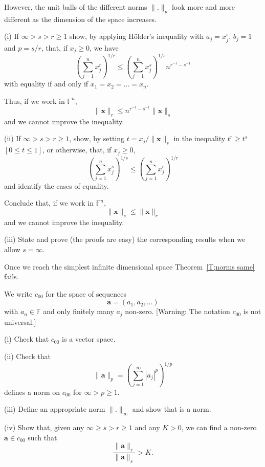 However, the unit balls of the different norms $\|.\|_{p}$
look more and more different as the dimension of the space increases.
\begin{exercise}\label{E;increase norm} (i) If $\infty>s>r\geq 1$ 
show, by applying H\"{o}lder's inequality with
$a_{j}=x_{j}^{s}$, $b_{j}=1$ and $p=s/r$, that,
if $x_{j}\geq 0$, we have
\[\left(\sum_{j=1}^{n}x_{j}^{r}\right)^{1/r}\leq
\left(\sum_{j=1}^{n}x_{j}^{s}\right)^{1/s}n^{r^{-1}-s^{-1}}\]
with equality if and only if $x_{1}=x_{2}=\dots=x_{n}$.

Thus, if we work in ${\mathbb F}^{n}$,
\[\|{\mathbf x}\|_{r}\leq n^{r^{-1}-s^{-1}}\|{\mathbf x}\|_{s}\]
and we cannot improve the inequality.

(ii) If $\infty>s>r\geq 1$, show, by setting $t=x_{j}/\|{\mathbf x}\|_{s}$
in the inequality $t^{r}\geq t^{s}$ $[0\leq t\leq 1]$,
or otherwise, that, if $x_{j}\geq 0$,
\[\left(\sum_{j=1}^{n}x_{j}^{s}\right)^{1/s}\leq
\left(\sum_{j=1}^{n}x_{j}^{r}\right)^{1/r}\]
and identify the cases of equality.

Conclude that, if we work in ${\mathbb F}^{n}$,
\[\|{\mathbf x}\|_{s}\leq \|{\mathbf x}\|_{r}\]
and we cannot improve the inequality.

(iii) State and prove (the proofs are easy)
the corresponding results when we allow $s=\infty$.
\end{exercise}

Once we reach the simplest infinite dimensional space
Theorem~\ref{T;norms same} fails.
\begin{definition} We write $c_{00}$ for the space
of sequences
\[{\mathbf a}=(a_{1},a_{2},\dots)\]
with $a_{n}\in{\mathbb F}$ and only finitely many $a_{j}$
non-zero. [Warning: The notation $c_{00}$ is not universal.]
\end{definition}
\begin{exercise}\label{E;many norms} 
(i) Check that  $c_{00}$ is a vector space.

(ii) Check that 
\[\|{\mathbf a}\|_{p}=\left(\sum_{j=1}^{\infty}|a_{j}|^{p}\right)^{1/p}\]
defines a norm on $c_{00}$ for $\infty>p\geq 1$.

(iii) Define an appropriate norm $\|.\|_{\infty}$ and
show that is a norm.

(iv) Show that, given any   $\infty\geq s>r\geq 1$
and any $K>0$, we can find a non-zero ${\mathbf a}\in c_{00}$
such that
\[\frac{\|{\mathbf a}\|_{r}}{\|{\mathbf a}\|_{s}}>K.\]
\end{exercise} 
